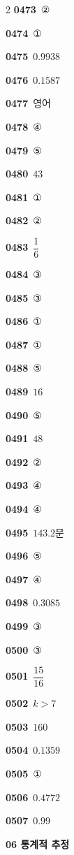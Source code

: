 \documentclass[10pt,a4paper]{article}
\begin{document}
\begin{multicols}{2}
\noindent\textbf{0473}\ ②\par
\noindent\textbf{0474}\ ①\par
\noindent\textbf{0475}\ $0.9938$\par
\noindent\textbf{0476}\ $0.1587$\par
\noindent\textbf{0477}\ 영어\par
\noindent\textbf{0478}\ ④\par
\noindent\textbf{0479}\ ⑤\par
\noindent\textbf{0480}\ $43$\par
\noindent\textbf{0481}\ ①\par
\noindent\textbf{0482}\ ②\par
\noindent\textbf{0483}\ $\dfrac{1}{6}$\par
\noindent\textbf{0484}\ ③\par
\noindent\textbf{0485}\ ③\par
\noindent\textbf{0486}\ ①\par
\noindent\textbf{0487}\ ①\par
\noindent\textbf{0488}\ ⑤\par
\noindent\textbf{0489}\ $16$\par
\noindent\textbf{0490}\ ⑤\par
\noindent\textbf{0491}\ $48$\par
\noindent\textbf{0492}\ ②\par
\noindent\textbf{0493}\ ④\par
\noindent\textbf{0494}\ ④\par
\noindent\textbf{0495}\ $143.2$분\par
\noindent\textbf{0496}\ ⑤\par
\noindent\textbf{0497}\ ④\par
\noindent\textbf{0498}\ $0.3085$\par
\noindent\textbf{0499}\ ③\par
\noindent\textbf{0500}\ ③\par
\noindent\textbf{0501}\ $\dfrac{15}{16}$\par
\noindent\textbf{0502}\ $k>7$\par
\noindent\textbf{0503}\ $160$\par
\noindent\textbf{0504}\ $0.1359$\par
\noindent\textbf{0505}\ ①\par
\noindent\textbf{0506}\ $0.4772$\par
\noindent\textbf{0507}\ $0.99$\par
\noindent\textbf{06 통계적 추정}\par\smallskip

\end{multicols}
\end{document}

